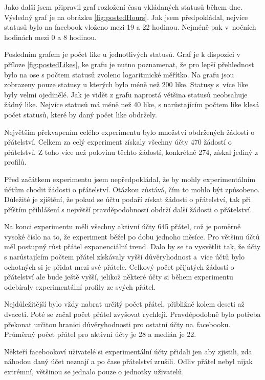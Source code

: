 \documentclass[thesis=M,czech]{FITthesis}[2013/05/10]
\begin{document}
Jako další jsem připravil graf rozložení času vkládaných statusů během dne. Výsledný graf je na obrázku \ref{fig:postedHours}. Jak jsem předpokládal, nejvíce statusů bylo na facebook vloženo mezi 19 a 22 hodinou. Nejméně pak v~nočních hodinách mezi 0 a 8 hodinou.

Posledním grafem je počet like u jednotlivých statusů. Graf je k dispozici v příloze \ref{fig:postedLikes}, ke grafu je nutno poznamenat, že pro lepší přehlednost bylo na ose s počtem statusů zvoleno logaritmické měřítko. Na grafu jsou zobrazeny pouze statusy u kterých bylo méně než 200 like. Statusy s~více like byly velmi ojedinělé. Jak je vidět z grafu naprostá většina statusů neobsahuje žádný like. Nejvíce statusů má méně než 40 like, s narůstajícím počtem like klesá počet statusů, které by daný počet like obdržely.



Největším překvapením celého experimentu bylo množství obdržených žádostí o přátelství. Celkem za celý experiment získaly všechny účty 470 žádostí o přátelství. Z toho více než polovinu těchto žádostí, konkrétně 274, získal jediný z profilů. 

Před začátkem experimentu jsem nepředpokládal, že by mohly experimentálním účtům chodit žádosti o přátelství. Otázkou zůstává, čím to mohlo být způsobeno. Důležité je zjištění, že pokud se účtu podaří získat žádosti o přátelství, tak při příštím přihlášení s největší pravděpodobností obdrží další žádosti o přátelství.

Na konci experimentu měli všechny aktivní účty 645 přátel, což je poměrně vysoké číslo na to, že experiment běžel po dobu jednoho měsíce. Pro většinu účtů měl postupný růst přátel exponenciální trend. Dalo by se to vysvětlit tak, že účty s narůstajícím počtem přátel získávaly vyšší důvěryhodnost a~více účtů bylo ochotných si je přidat mezi své přátele. Celkový počet přijatých žádostí o přátelství ale bude ještě vyšší, jelikož některé účty si během experimentu odebíraly experimentální profily ze svých přátel. 

Nejdůležitější bylo vždy nabrat určitý počet přátel, přibližně kolem deseti až dvaceti. Poté se začal počet přátel zvyšovat rychleji. Pravděpodobně bylo potřeba překonat určitou hranici důvěryhodnosti pro ostatní účty na~facebooku. Průměrný počet přátel pro aktivní účty je 28 a medián je 22. 

Někteří facebookoví uživatelé si experimentální účty přidali jen aby zjistili, zda náhodou daný účet neznají a po čase přátelství zrušili. Odliv přátel nebyl nijak extrémní, většinou se jednalo pouze o jednotky uživatelů. 
\end{document}
